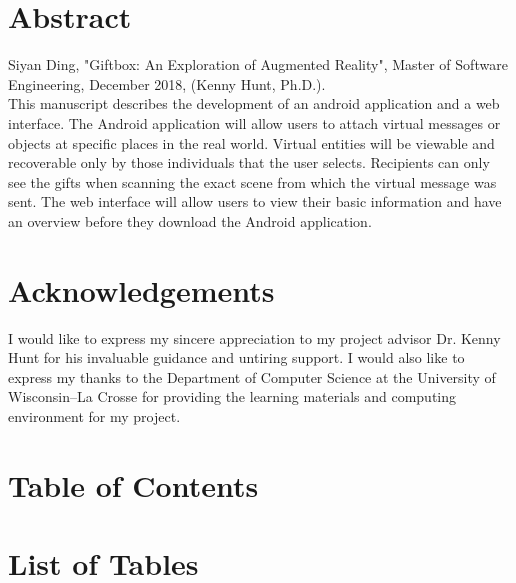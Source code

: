 \documentclass[letterpaper,12pt]{report}
\begin{document}
\hypersetup{pageanchor=false}
	
\clearpage


\clearpage

\hypersetup{pageanchor=true}
\setcounter{page}{1}
\renewcommand\arraystretch{1.5}

\section*{Abstract}
Siyan Ding, "Giftbox:  An Exploration of Augmented Reality", Master of Software Engineering, December 2018, (Kenny Hunt, Ph.D.). \\

This manuscript describes the development of an android application and a web interface. The Android application will allow users to attach virtual messages or objects at specific places in the real world. Virtual entities will be viewable and recoverable only by those individuals that the user selects. Recipients can only see the gifts when scanning the exact scene from which the virtual message was sent. The web interface will allow users to view their basic information and have an overview before they download the Android application.
\clearpage

\section*{Acknowledgements}
I would like to express my sincere appreciation to my project advisor Dr. Kenny Hunt for his invaluable guidance and untiring support. I would also like to express my thanks to the Department of Computer Science at the University of Wisconsin--La Crosse for providing the learning materials and computing environment for my project.
\clearpage

\section*{Table of Contents}
\tableofcontents
\clearpage


\section*{List of Tables}
\listoftables
\clearpage
\end{document}
